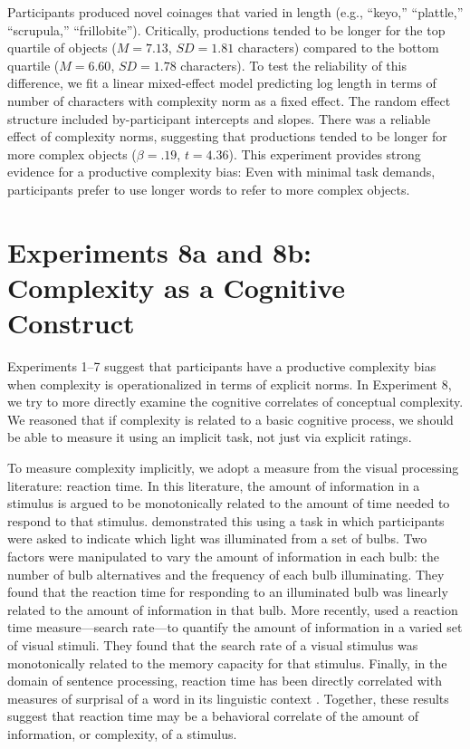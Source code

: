 Participants produced novel coinages that varied in length (e.g., ``keyo,'' ``plattle,'' ``scrupula,'' ``frillobite''). Critically, productions tended to be longer for the top quartile of objects ($M = 7.13$, $SD = 1.81$ characters) compared to the bottom quartile ($M = 6.60$, $SD = 1.78$ characters). To test the reliability of this difference, we fit a linear mixed-effect model predicting log length in terms of number of characters with complexity norm as a fixed effect. The random effect structure included by-participant intercepts and slopes. There was a reliable effect of complexity norms, suggesting that productions tended to be longer for more complex objects ($\beta = .19$, $t = 4.36$). This experiment provides strong evidence for a productive complexity bias: Even with minimal task demands, participants prefer to use longer words to refer to more complex objects.

\section{Experiments 8a and 8b: Complexity as a Cognitive Construct}
Experiments 1--7 suggest that participants have a productive complexity bias when complexity is operationalized in terms of explicit norms. In Experiment 8, we try to more directly examine the cognitive correlates of conceptual complexity. We reasoned that if complexity is related to a basic cognitive process, we should be able to measure it using an implicit task, not just via explicit ratings.

To measure complexity implicitly, we adopt a measure from the visual processing literature: reaction time. In this literature, the amount of information in a stimulus is argued to be monotonically related to the amount of time needed to respond to that stimulus.  demonstrated this using a task in which participants were asked to indicate which light was illuminated from a set of bulbs. Two factors were manipulated to vary the amount of information in each bulb: the number of bulb alternatives and the frequency of each bulb illuminating. They found that the reaction time for responding to an illuminated bulb was linearly related to the amount of information in that bulb. More recently,  used a reaction time measure---search rate---to quantify the amount of information in a varied set of visual stimuli. They found that the search rate of a visual stimulus was monotonically related to the memory capacity for that stimulus. Finally, in the domain of sentence processing, reaction time has been directly correlated with measures of surprisal of a word in its linguistic context \cite{demberg2008data,levy2008expectation}. Together, these results suggest that reaction time may be a behavioral correlate of the amount of information, or complexity, of a stimulus.

